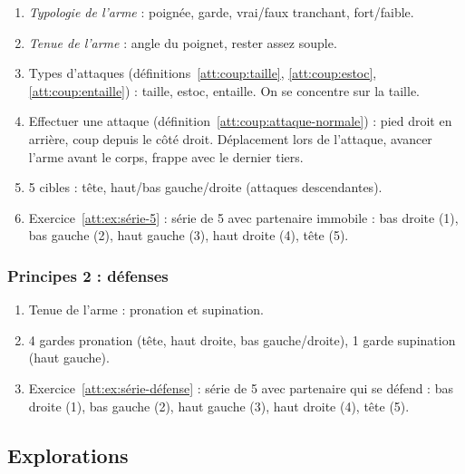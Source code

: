 \begin{enumerate}


	\item \emph{Typologie de l'arme} : poignée, garde, vrai/faux tranchant, fort/faible.
	
	\item \emph{Tenue de l'arme} : angle du poignet, rester assez souple.

	\item Types d'attaques (définitions~\ref{att:coup:taille}, \ref{att:coup:estoc}, \ref{att:coup:entaille}) : taille, estoc, entaille.
	On se concentre sur la taille.
	
	\item Effectuer une attaque (définition~\ref{att:coup:attaque-normale}) : pied droit en arrière, coup depuis le côté droit.
	Déplacement lors de l'attaque, avancer l'arme avant le corps, frappe avec le dernier tiers.
	
	\item 5 cibles : tête, haut/bas gauche/droite (attaques descendantes).
	
	\item Exercice~\ref{att:ex:série-5} : série de 5 avec partenaire immobile : bas droite (1), bas gauche (2), haut gauche (3), haut droite (4), tête (5).
\end{enumerate}


\subsubsection{Principes 2 : défenses}


\begin{enumerate}
	\item Tenue de l'arme : pronation et supination.

	\item 4 gardes pronation (tête, haut droite, bas gauche/droite), 1 garde supination (haut gauche).
	
	\item Exercice~\ref{att:ex:série-défense} : série de 5 avec partenaire qui se défend : bas droite (1), bas gauche (2), haut gauche (3), haut droite (4), tête (5).
\end{enumerate}


\subsection{Explorations}


